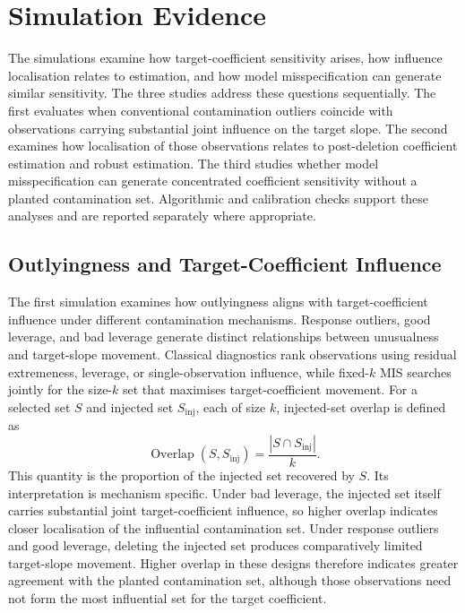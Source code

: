 \documentclass[../main.tex]{subfiles}
\begin{document}
\section{Simulation Evidence}
\label{sec:simulation}

The simulations examine how target-coefficient sensitivity arises, how influence localisation relates to estimation, and how model misspecification can generate similar sensitivity. The three studies address these questions sequentially. The first evaluates when conventional contamination outliers coincide with observations carrying substantial joint influence on the target slope. The second examines how localisation of those observations relates to post-deletion coefficient estimation and robust estimation. The third studies whether model misspecification can generate concentrated coefficient sensitivity without a planted contamination set. Algorithmic and calibration checks support these analyses and are reported separately where appropriate.

\FloatBarrier
\subsection{Outlyingness and Target-Coefficient Influence}
\label{subsec:detection-performance}

The first simulation examines how outlyingness aligns with target-coefficient influence under different contamination mechanisms. Response outliers, good leverage, and bad leverage generate distinct relationships between unusualness and target-slope movement. Classical diagnostics rank observations using residual extremeness, leverage, or single-observation influence, while fixed-\(k\) MIS searches jointly for the size-\(k\) set that maximises target-coefficient movement. For a selected set \(S\) and injected set \(S_{\mathrm{inj}}\), each of size \(k\), injected-set overlap is defined as
\[
\operatorname{Overlap}(S,S_{\mathrm{inj}})
=
\frac{|S\cap S_{\mathrm{inj}}|}{k}.
\]
This quantity is the proportion of the injected set recovered by \(S\). Its interpretation is mechanism specific. Under bad leverage, the injected set itself carries substantial joint target-coefficient influence, so higher overlap indicates closer localisation of the influential contamination set. Under response outliers and good leverage, deleting the injected set produces comparatively limited target-slope movement. Higher overlap in these designs therefore indicates greater agreement with the planted contamination set, although those observations need not form the most influential set for the target coefficient.
\end{document}
